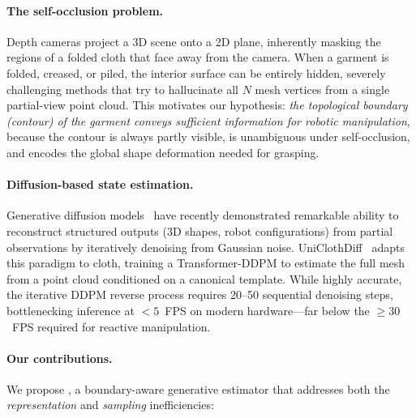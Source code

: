 \documentclass{article}
\begin{document}
\paragraph{The self-occlusion problem.}
Depth cameras project a 3D scene onto a 2D plane, inherently masking the regions of a folded cloth that face away from the camera.
When a garment is folded, creased, or piled, the interior surface can be entirely hidden, severely challenging methods that try to hallucinate all $N$ mesh vertices from a single partial-view point cloud.
This motivates our hypothesis: \emph{the topological boundary (contour) of the garment conveys sufficient information for robotic manipulation}, because the contour is always partly visible, is unambiguous under self-occlusion, and encodes the global shape deformation needed for grasping.

\paragraph{Diffusion-based state estimation.}
Generative diffusion models~\cite{ho2020ddpm,song2019score} have recently demonstrated remarkable ability to reconstruct structured outputs (\eg 3D shapes, robot configurations) from partial observations by iteratively denoising from Gaussian noise.
UniClothDiff~\cite{tian2025uniclothdiff} adapts this paradigm to cloth, training a Transformer-DDPM to estimate the full mesh from a point cloud conditioned on a canonical template.
While highly accurate, the iterative DDPM reverse process requires 20--50 sequential denoising steps, bottlenecking inference at $< 5$~FPS on modern hardware---far below the $\geq 30$~FPS required for reactive manipulation.

\paragraph{Our contributions.}
We propose \ours{}, a boundary-aware generative estimator that addresses both the \emph{representation} and \emph{sampling} inefficiencies:
\end{document}

